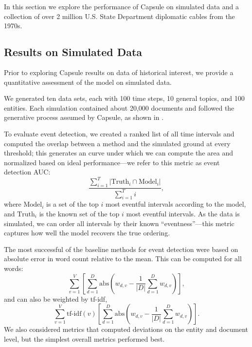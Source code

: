 

In this section we explore the performance of Capsule on simulated data and a collection of over 2 million U.S. State Department diplomatic cables from the 1970s.


\subsection{Results on Simulated Data}
Prior to exploring Capsule results on data of historical interest, we provide a quantitative assessment of the model on simulated data.

We generated ten data sets, each with 100 time steps, 10 general topics, and 100 entities. Each simulation contained about 20,000 documents and followed the generative process assumed by Capsule, as shown in .

To evaluate event detection, we created a ranked list of all time intervals and computed the overlap between a method and the simulated ground at every threshold; this generates an curve under which we can compute the area and normalized based on ideal performance---we refer to this metric as event detection AUC:
\begin{equation}
\frac{\sum_{i=1}^T \vert \mbox{Truth}_i \cap \mbox{Model}_i \vert}{\sum_{i=1}^T i},
\end{equation}
where $\mbox{Model}_i$ is a set of the top $i$ most eventful intervals according to the model, and $\mbox{Truth}_i$ is the known set of the top $i$ most eventful intervals.  As the data is simulated, we can order all intervals by their known ``eventness''---this metric captures how well the model recovers the true ordering.

The most successful of the baseline methods for event detection were based on absolute error in word count relative to the mean.  This can be computed for all words:
\begin{equation}
	\sum_{v=1}^V\left[\sum_{d=1}^D \mbox{abs}\left( w_{d,v} - \frac{1}{\vert D \vert}\sum_{d=1}^D w_{d,v} \right) \right],
\label{eq:wordev}
\end{equation}
and can also be weighted by tf-idf, 
\begin{equation}
	\sum_{v=1}^V\mbox{tf-idf}(v)\left[\sum_{d=1}^D \mbox{abs}\left( w_{d,v} - \frac{1}{\vert D \vert}\sum_{d=1}^D w_{d,v} \right) \right].
\label{eq:tfidfwordev}
\end{equation}
We also considered metrics that computed deviations on the entity and document level, but the simplest overall metrics performed best.


